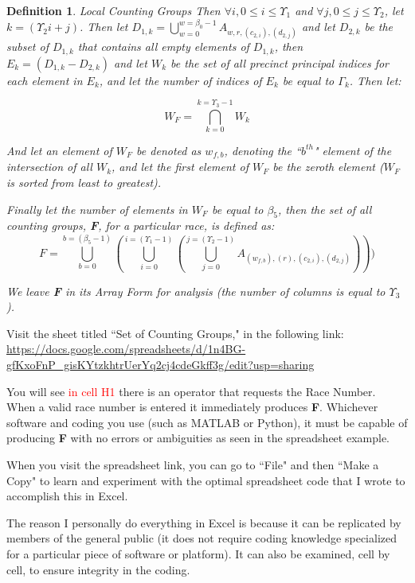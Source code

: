 \documentclass[preprint,13pt]{elsarticle}
\newtheorem{definition}{Definition}[section]
\begin{document}
\begin{definition}{Local Counting Groups}
Then $\forall i, 0 \le i \le \Upsilon_{1}$ and $\forall j, 0 \le j \le \Upsilon_{2}$, let $k=(\Upsilon_{2}i+j)$.
\newpage
Then let $D_{1,k}=\bigcup_{w=0}^{w=\beta_{0}-1}A_{w,r,(c_{2,i}),(d_{2,j})}$ and let $D_{2,k}$ be the subset of $D_{1,k}$ that contains all empty elements of $D_{1,k}$, then $E_{k}=(D_{1,k}-D_{2,k})$ and let $W_{k}$ be the set of all precinct principal indices for each element in $E_{k}$, and let the number of indices of $E_{k}$ be equal to $\Gamma_{k}$. Then let:

$$W_{F} = \bigcap_{k=0}^{k=\Upsilon_{3}-1}W_{k}$$

And let an element of $W_{F}$ be denoted as $w_{f,b}$, denoting the ``$b^{th}$" element of the intersection of all $W_{k}$, and let the first element of $W_{F}$ be the zeroth element ($W_{F}$ is sorted from least to greatest).

Finally let the number of elements in $W_{F}$ be equal to $\beta_{5}$, then the set of all counting groups, \textbf{F}, for a particular race, is defined as:
$$F=\bigcup_{b=0}^{b=(\beta_{5}-1)}(\bigcup_{i=0}^{i=(\Upsilon_{1}-1)}(\bigcup_{j=0}^{j=(\Upsilon_{2}-1)}A_{(w_{f,b}),(r),(c_{2,i}),(d_{2,j})})))$$

We leave \textbf{F} in its Array Form for analysis (the number of columns is equal to $\Upsilon_{3}$).
\end{definition}

Visit the sheet titled ``Set of Counting Groups," in the following link: \url{https://docs.google.com/spreadsheets/d/1n4BG-gfKxoFnP_gisKYtzkhtrUerYq2cj4cdeGkff3g/edit?usp=sharing}

You will see \textcolor{red}{in cell H1} there is an operator that requests the Race Number. When a valid race number is entered it immediately produces \textbf{F}.  Whichever software and coding you use (such as MATLAB or Python), it must be capable of producing \textbf{F} with no errors or ambiguities as seen in the spreadsheet example.

When you visit the spreadsheet link, you can go to ``File" and then ``Make a Copy" to learn and experiment with the optimal spreadsheet code that I wrote to accomplish this in Excel. 

The reason I personally do everything in Excel is because it can be replicated by members of the general public (it does not require coding knowledge specialized for a particular piece of software or platform). It can also be examined, cell by cell, to ensure integrity in the coding.
\end{document}
